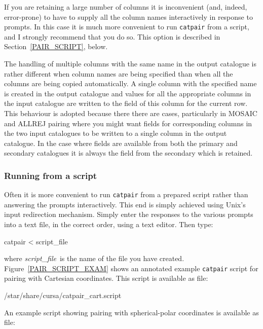 \documentclass[twoside,11pt]{starlink}
\begin{document}
If you are retaining a large number of columns it is inconvenient (and,
indeed, error-prone) to have to supply all the column names interactively
in response to prompts. In this case it is much more  convenient to run
\texttt{catpair} from a script, and I strongly recommend that you do so. This
option is described in Section~\ref{PAIR_SCRIPT}, below.

The handling of multiple columns with the same name in the output catalogue
is rather different when column names are being specified than when all the
columns are being copied automatically. A single column with the specified
name is created in the output catalogue and values for all the appropriate
columns in the input catalogue are written to the field of this column
for the current row. This behaviour is adopted because there there are
cases, particularly in MOSAIC and ALLREJ pairing where you might want
fields for corresponding columns in the two input catalogues to be
written to a single column in the output catalogue. In the case where
fields are available from both the primary and secondary catalogues it is
always the field from the secondary which is retained.

\subsubsection{\label{PAIR_SCRIPT}Running from a script}

Often it is more convenient to run \texttt{catpair} from a prepared script
rather than answering the prompts interactively. This end is simply
achieved using Unix's input redirection mechanism. Simply enter the
responses to the various prompts into a text file, in the correct order,
using a text editor. Then type:

\begin{terminalv}
catpair  < script_file
\end{terminalv}

where \textit{script\_file}\, is the name of the file you have created.
Figure~\ref{PAIR_SCRIPT_EXAM} shows an annotated example \texttt{catpair}
script for pairing with Cartesian coordinates.  This script is available
as file:

\begin{terminalv}
/star/share/cursa/catpair_cart.script
\end{terminalv}

An example script showing pairing with spherical-polar coordinates is
available as file:
\end{document}
